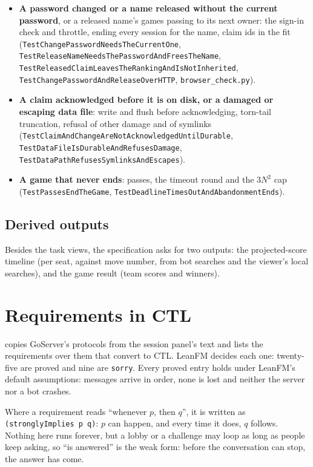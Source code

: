 \documentclass[11pt,oneside]{book}
\begin{document}
\begin{itemize}
  \item \textbf{A password changed or a name released without the current
  password}, or a released name's games passing to its next owner: the sign-in
  check and throttle, ending every session for the name, claim ids in the fit
  (\texttt{TestChangePasswordNeedsTheCurrentOne},
  \texttt{TestReleaseNameNeedsThePasswordAndFreesTheName},
  \texttt{TestReleasedClaimLeavesTheRankingAndIsNotInherited},
  \texttt{TestChangePasswordAndReleaseOverHTTP}, \texttt{browser\_check.py}).
  \item \textbf{A claim acknowledged before it is on disk, or a damaged or
  escaping data file}: write and flush before acknowledging, torn-tail
  truncation, refusal of other damage and of symlinks
  (\texttt{TestClaimAndChangeAreNotAcknowledgedUntilDurable},
  \texttt{TestDataFileIsDurableAndRefusesDamage}, \texttt{TestDataPathRefusesSymlinksAndEscapes}).
  \item \textbf{A game that never ends}: passes, the timeout round and the
  \(3N^2\) cap (\texttt{TestPassesEndTheGame},
  \texttt{TestDeadlineTimesOutAndAbandonmentEnds}).
\end{itemize}

\section{Derived outputs}
Besides the task views, the specification asks for two outputs: the
projected-score timeline (per seat, against move number, from bot searches and
the viewer's local searches), and the game result (team scores and winners).

\chapter{Requirements in CTL}
 copies GoServer's protocols from the session
panel's text and lists the requirements over them that convert to CTL.
LeanFM decides each one: twenty-five are proved and nine are
\texttt{sorry}. Every proved entry holds under LeanFM's default assumptions:
messages arrive in order, none is lost and neither the server nor a bot
crashes.

Where a requirement reads ``whenever $p$, then $q$'', it is written as
\texttt{(stronglyImplies p q)}: $p$ can happen, and every time it does, $q$
follows. Nothing here runs forever, but a lobby or a challenge may loop as long
as people keep asking, so ``is answered'' is the weak form: before the
conversation can stop, the answer has come.
\end{document}

